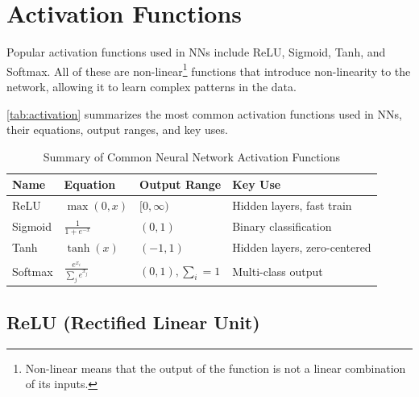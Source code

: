 \documentclass[oneside,11pt,dvipsnames]{book}
\numberwithin{equation}{section}
\theoremstyle{definition}
\theoremstyle{remark}
\newcommand{\sigmoid}[1]{\mathrm{sigmoid}\left(#1\right)}
\begin{document}
\section{Activation Functions}\label{sec:activation}
Popular activation functions used in NNs include ReLU, Sigmoid, Tanh, and Softmax. All of these are non-linear\footnote{Non-linear means that the output of the function is not a linear combination of its inputs.} functions that introduce non-linearity to the network, allowing it to learn complex patterns in the data.

\autoref{tab:activation} summarizes the most common activation functions used in NNs, their equations, output ranges, and key uses.

\begin{table}
  \centering
  \caption{Summary of Common Neural Network Activation Functions}\label{tab:activation}
  \small
  \begin{tabular}{llll}
    \toprule
    \textbf{Name} & \textbf{Equation} & \textbf{Output Range} & \textbf{Key Use} \\
    \midrule
    ReLU      & $ \max(0, x) $                   & $[0, \infty)$   & Hidden layers, fast train \\    
    Sigmoid   & $ \frac{1}{1 + e^{-x}} $         & $(0, 1)$        & Binary classification \\
    Tanh      & $ \tanh(x) $                     & $(-1, 1)$       & Hidden layers, zero-centered \\
    Softmax   & $ \frac{e^{x_i}}{\sum_j e^{x_j}} $& $(0, 1), \sum_i=1 $ & Multi-class output \\    
    \bottomrule
  \end{tabular}
\end{table}


\subsection{ReLU (Rectified Linear Unit)}\label{sec:relu}
\end{document}
